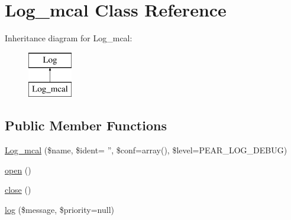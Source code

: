 \hypertarget{class_log__mcal}{
\section{Log\_\-mcal Class Reference}
\label{class_log__mcal}
}
Inheritance diagram for Log\_\-mcal:\begin{figure}[H]
\begin{center}
\leavevmode
\includegraphics[height=2.000000cm]{class_log__mcal}
\end{center}
\end{figure}
\subsection*{Public Member Functions}
\begin{DoxyCompactItemize}
\item 
\hyperlink{class_log__mcal_a240f4f273a75eaa0815be0fc21ec1a1c}{Log\_\-mcal} (\$name, \$ident= '', \$conf=array(), \$level=PEAR\_\-LOG\_\-DEBUG)
\item 
\hyperlink{class_log__mcal_a44a2ac59a3b91f8c18905dce700934d6}{open} ()
\item 
\hyperlink{class_log__mcal_aa69c8bf1f1dcf4e72552efff1fe3e87e}{close} ()
\item 
\hyperlink{class_log__mcal_ac3758dfa38a67df158a446847cf06413}{log} (\$message, \$priority=null)
\end{DoxyCompactItemize}
